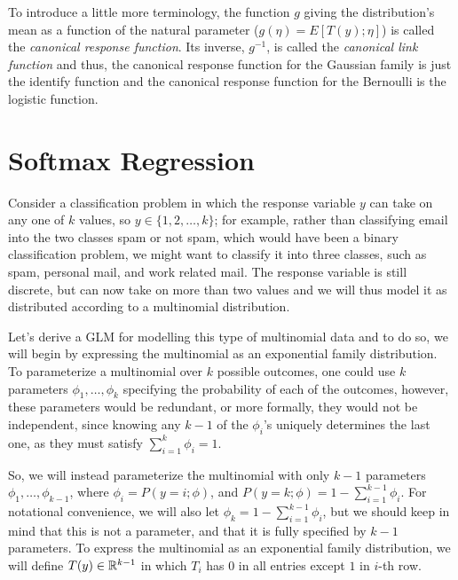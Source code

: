 To introduce a little more terminology, the function $g$ giving the distribution’s mean as a function 
of the natural parameter ($g(\eta) = E[T(y); \eta]$) is called the \emph{canonical response function}.\newline
Its inverse, $g^{-1}$, is called the \emph{canonical link function} and thus, the canonical response function
for the Gaussian family is just the identify function and the canonical response function for the Bernoulli
is the logistic function.

\section{Softmax Regression}
Consider a classification problem in which the response variable $y$ can take on any one of $k$ values,
so $y \in \{1, 2, \dots, k\}$; for example, rather than classifying email into the two classes 
spam or not spam, which would have been a binary classification problem, we might want to classify it
into three classes, such as spam, personal mail, and work related mail.\newline
The response variable is still discrete, but can now take on more than two values and we will thus model it 
as distributed according to a multinomial distribution.

Let’s derive a GLM for modelling this type of multinomial data and to do so, we will begin by expressing
the multinomial as an exponential family distribution.\newline
To parameterize a multinomial over $k$ possible outcomes, one could use $k$ parameters $\phi_1, \dots, \phi_k$ 
specifying the probability of each of the outcomes, however, these parameters would be redundant, or more formally,
they would not be independent, since knowing any $k-1$ of the $\phi_i$’s uniquely determines the last one,
as they must satisfy $\displaystyle \sum _{i = 1}^k \phi_i = 1$.

So, we will instead parameterize the multinomial with only $k-1$ parameters $\phi_1, \dots, \phi_{k-1}$, 
where $\displaystyle \phi_i =P(y=i; \phi)$, and $\displaystyle P(y = k; \phi) = 1 - \sum _{i=1}^{k-1} \phi_i$.\newline
For notational convenience, we will also let $\displaystyle \phi_k= 1 - \sum _{i=1}^{k-1} \phi_i$, 
but we should keep in mind that this is not a parameter, and that it is fully specified by $k-1$ parameters.\newline
To express the multinomial as an exponential family distribution, we will define $T(y) \in \mathbb{R} ^{k-1}$ in which 
$T_i$ has $0$ in all entries except $1$ in $i$-th row.

